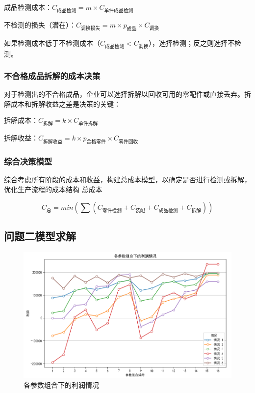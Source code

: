 \documentclass[withoutpreface,bwprint]{cumcmthesis}
\begin{document}
成品检测成本：$C_{\text{成品检测}} = m \times C_{\text{单件成品检测}}$

不检测的损失（潜在）：$C_{\text{调换损失}} = m \times p_{\text{成品}} \times C_{\text{调换}}$

如果检测成本低于不检测成本（$C_{\text{成品检测}}<C_{\text{调换}}$），选择检测；反之则选择不检测。

\subsubsection{不合格成品拆解的成本决策}
对于检测出的不合格成品，企业可以选择拆解以回收可用的零配件或直接丢弃。拆解成本和拆解收益之差是决策的关键：

拆解成本：$C_{\text{拆解}} = k \times C_{\text{单件拆解}}$ 

拆解收益：$C_{\text{拆解收益}} = k \times p_{\text{合格零件}} \times C_{\text{零件回收}}$

\subsubsection{综合决策模型}

综合考虑所有阶段的成本和收益，构建总成本模型，以确定是否进行检测或拆解，优化生产流程的成本结构
总成本

$$C_{\text{总}} = min(\sum (C_{\text{零件检测}} + C_{\text{装配}} + C_{\text{成品检测}} + C_{\text{拆解}}))$$


\subsection{问题二模型求解}

\begin{figure}[htbp]
    \centering
    \includegraphics[width=1\linewidth]{figure/各参数组合的利润情况.png}
    \caption{各参数组合下的利润情况}
    \label{profit}
\end{figure}
\end{document}
